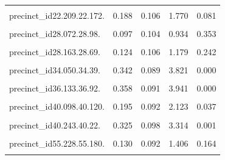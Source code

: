 \documentclass[
  letterpaper,
  DIV=11,
  numbers=noendperiod]{scrartcl}
\begin{document}
\begin{table}[!h]
\begin{threeparttable}
\begin{tabular}{lrrrr}
\cellcolor{gray!10}{precinct\_id22.158.22.203.} & \cellcolor{gray!10}{0.165} & \cellcolor{gray!10}{0.088} & \cellcolor{gray!10}{1.879} & \cellcolor{gray!10}{0.064}\\
precinct\_id22.209.22.172. & 0.188 & 0.106 & 1.770 & 0.081\\
\cellcolor{gray!10}{precinct\_id28.056.28.149.} & \cellcolor{gray!10}{-0.011} & \cellcolor{gray!10}{0.112} & \cellcolor{gray!10}{-0.099} & \cellcolor{gray!10}{0.921}\\
\addlinespace
precinct\_id28.072.28.98. & 0.097 & 0.104 & 0.934 & 0.353\\
\cellcolor{gray!10}{precinct\_id28.139.28.145.} & \cellcolor{gray!10}{0.040} & \cellcolor{gray!10}{0.111} & \cellcolor{gray!10}{0.359} & \cellcolor{gray!10}{0.721}\\
precinct\_id28.163.28.69. & 0.124 & 0.106 & 1.179 & 0.242\\
\cellcolor{gray!10}{precinct\_id29.241.29.172.} & \cellcolor{gray!10}{0.067} & \cellcolor{gray!10}{0.089} & \cellcolor{gray!10}{0.749} & \cellcolor{gray!10}{0.456}\\
precinct\_id34.050.34.39. & 0.342 & 0.089 & 3.821 & 0.000\\
\addlinespace
\cellcolor{gray!10}{precinct\_id34.151.34.125.} & \cellcolor{gray!10}{0.098} & \cellcolor{gray!10}{0.093} & \cellcolor{gray!10}{1.050} & \cellcolor{gray!10}{0.297}\\
precinct\_id36.133.36.92. & 0.358 & 0.091 & 3.941 & 0.000\\
\cellcolor{gray!10}{precinct\_id40.044.40.68.} & \cellcolor{gray!10}{0.236} & \cellcolor{gray!10}{0.096} & \cellcolor{gray!10}{2.457} & \cellcolor{gray!10}{0.016}\\
precinct\_id40.098.40.120. & 0.195 & 0.092 & 2.123 & 0.037\\
\cellcolor{gray!10}{precinct\_id40.134.40.174.} & \cellcolor{gray!10}{0.216} & \cellcolor{gray!10}{0.090} & \cellcolor{gray!10}{2.399} & \cellcolor{gray!10}{0.019}\\
\addlinespace
precinct\_id40.243.40.22. & 0.325 & 0.098 & 3.314 & 0.001\\
\cellcolor{gray!10}{precinct\_id40.244.40.46.} & \cellcolor{gray!10}{0.178} & \cellcolor{gray!10}{0.095} & \cellcolor{gray!10}{1.873} & \cellcolor{gray!10}{0.065}\\
precinct\_id55.228.55.180. & 0.130 & 0.092 & 1.406 & 0.164\\
\cellcolor{gray!10}{precinct\_id58.162.58.98.} & \cellcolor{gray!10}{0.278} & \cellcolor{gray!10}{0.097} & \cellcolor{gray!10}{2.867} & \cellcolor{gray!10}{0.005}\\

\end{tabular}
\end{threeparttable}
\end{table}
\end{document}
